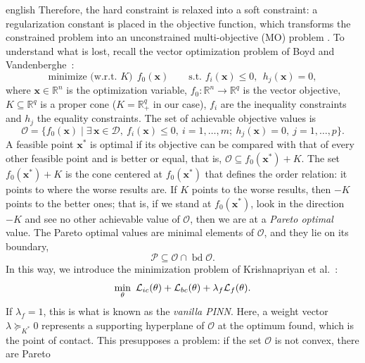 \begin{hyphenrules}{english}
Therefore, the hard constraint is relaxed into a soft constraint: a regularization constant is placed in
the objective function, which transforms the constrained problem into an unconstrained multi-objective
(MO) problem \cite{krishnapriyan2021}. To understand what is lost, recall the vector optimization
problem of Boyd and Vandenberghe~\cite{boyd2004}:
\begin{equation}
  \text{minimize (w.r.t. } K)\ \ f_0(\mathbf{x})\qquad\text{s.t. } f_i(\mathbf{x})\le0,\ \ h_j(\mathbf{x})=0,
  \label{eq:vector-opt}
\end{equation}
where $\mathbf{x}\in\mathbb{R}^n$ is the optimization variable, $f_0:\mathbb{R}^n\to\mathbb{R}^q$ is the vector objective,
$K\subseteq\mathbb{R}^q$ is a proper cone ($K=\mathbb{R}^q_+$ in our case), $f_i$ are the inequality constraints and
$h_j$ the equality constraints. The set of achievable objective values is
\begin{equation}
  \mathcal{O}=\{f_0(\mathbf{x})\mid\exists\,\mathbf{x}\in\mathcal{D},\ f_i(\mathbf{x})\le0,\ i=1,\dots,m;\ h_j(\mathbf{x})=0,\ j=1,\dots,p\}.
  \label{eq:achievable-set}
\end{equation}
A feasible point $\mathbf{x}^{*}$ is optimal if its objective can be compared with that of every other feasible
point and is better or equal, that is, $\mathcal{O}\subseteq f_0(\mathbf{x}^{*})+K$. The set $f_0(\mathbf{x}^{*})+K$ is
the cone centered at $f_0(\mathbf{x}^{*})$ that defines the order relation: it points to where the worse results
are. If $K$ points to the worse results, then $-K$ points to the better ones; that is, if we stand at
$f_0(\mathbf{x}^{*})$, look in the direction $-K$ and see no other achievable value of $\mathcal{O}$, then we are at
a \emph{Pareto optimal} value. The Pareto optimal values are minimal elements of $\mathcal{O}$, and they
lie on its boundary,
\begin{equation}
  \mathcal{P}\subseteq\mathcal{O}\cap\operatorname{bd}\mathcal{O}.
  \label{eq:pareto}
\end{equation}
In this way, we introduce the minimization problem of Krishnapriyan et al.~\cite{krishnapriyan2021}:
\begin{equation}
  \min_{\theta}\ \Loss_{ic}(\theta)+\Loss_{bc}(\theta)+\lambda_f\Loss_f(\theta).
  \label{eq:soft}
\end{equation}
If $\lambda_f=1$, this is what is known as the \emph{vanilla PINN}. Here, a weight vector
$\lambda\succeq_{K^{*}}0$ represents a supporting hyperplane of $\mathcal{O}$ at the optimum found, which is
the point of contact. This presupposes a problem: if the set $\mathcal{O}$ is not convex, there are Pareto

\end{hyphenrules}
